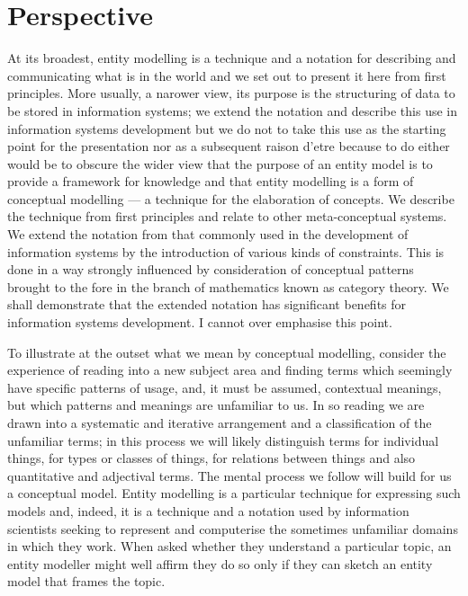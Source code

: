 \section{Perspective}
\label{Perspective}
At its broadest, entity modelling is a technique and a notation for describing and communicating what is in the world and we set out to present it here from first principles. More usually, a narower view, its purpose is the structuring of data to be stored in information systems; we extend the notation and describe this use in information systems development but we do not to take this use as the starting point for the presentation nor as a subsequent raison d'etre because to do either would be to obscure the wider view that the purpose of an entity model is to provide a framework for knowledge and that entity modelling is a form of conceptual modelling — a technique for the elaboration of concepts. We describe the technique from first principles and relate to other meta-conceptual systems. We extend the notation from that commonly used in the development of information systems by the introduction of various kinds of constraints. This is done in a way strongly influenced by consideration of conceptual patterns brought to the fore in the branch of mathematics known as category theory. We shall demonstrate that the extended notation has significant benefits for information systems development. I cannot over emphasise this point.

To illustrate at the outset what we mean by conceptual modelling, consider the experience of reading into a new subject area and finding terms which seemingly have specific patterns of usage, and, it must be assumed, contextual meanings, but which patterns and meanings are unfamiliar to us. In so reading we are drawn into a systematic and iterative arrangement and a classification of the unfamiliar terms; in this process we will likely distinguish terms for individual things, for types or classes of things, for relations between things and also quantitative and adjectival terms. The mental process we follow will build for us a conceptual model. Entity modelling is a particular technique for expressing such models and, indeed, it is a technique and a notation used by information scientists seeking to represent and computerise the sometimes unfamiliar domains in which they work. When asked whether they understand a particular topic, an entity modeller might well affirm they do so only if they can sketch an entity model that frames the topic.

